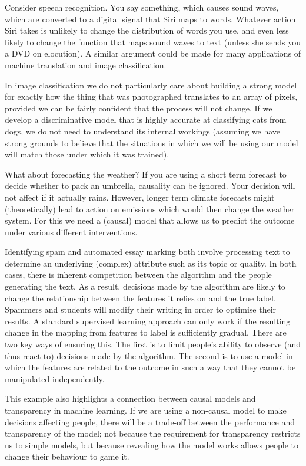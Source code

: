 \documentclass[11pt,a4paper,twoside]{report}
\theoremstyle{plain}
\theoremstyle{definition}
\begin{document}
Consider speech recognition. You say something, which causes sound waves, which are converted to a digital signal that Siri maps to words. Whatever action Siri takes is unlikely to change the distribution of words you use, and even less likely to change the function that maps sound waves to text (unless she sends you a DVD on elocution). A similar argument could be made for many applications of machine translation and image classification. 

In image classification we do not particularly care about building a strong model for exactly how the thing that was photographed translates to an array of pixels, provided we can be fairly confident that the process will not change. If we develop a discriminative model that is highly accurate at classifying cats from dogs, we do not need to understand its internal workings (assuming we have strong grounds to believe that the situations in which we will be using our model will match those under which it was trained).

What about forecasting the weather? If you are using a short term forecast to decide whether to pack an umbrella, causality can be ignored. Your decision will not affect if it actually rains. However, longer term climate forecasts might (theoretically) lead to action on emissions which would then change the weather system. For this we need a (causal) model that allows us to predict the outcome under various different interventions.

Identifying spam and automated essay marking both involve processing text to determine an underlying (complex) attribute such as its topic or quality. In both cases, there is inherent competition between the algorithm and the people generating the text. As a result, decisions made by the algorithm are likely to change the relationship between the features it relies on and the true label. Spammers and students will modify their writing in order to optimise their results. A standard supervised learning approach can only work if the resulting change in the mapping from features to label is sufficiently gradual. There are two key ways of ensuring this. The first is to limit people's ability to observe (and thus react to) decisions made by the algorithm. The second is to use a model in which the features are related to the outcome in such a way that they cannot be manipulated independently. 

This example also highlights a connection between causal models and transparency in machine learning. If we are using a non-causal model to make decisions affecting people, there will be a trade-off between the performance and transparency of the model; not because the requirement for transparency restricts us to simple models, but because revealing how the model works allows people to change their behaviour to game it. 
\end{document}
